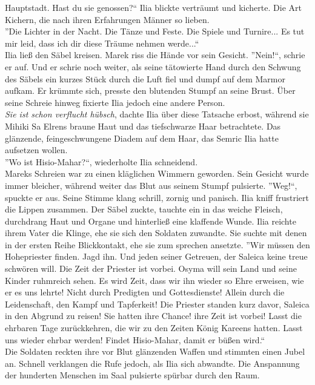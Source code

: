 Hauptstadt. Hast du sie genossen?`` Ilia blickte verträumt und kicherte. Die Art Kichern, die nach 
ihren Erfahrungen Männer so lieben.\\
''Die Lichter in der Nacht. Die Tänze und Feste. Die Spiele und Turnire... Es tut mir leid, dass 
ich dir diese Träume nehmen werde...``\\
Ilia ließ den Säbel kreisen. Marek riss die Hände vor sein Gesicht. ''Nein!``, schrie er auf. Und 
er schrie noch weiter, als seine tätowierte Hand durch den Schwung des Säbels ein kurzes Stück 
durch die Luft fiel und dumpf auf dem Marmor aufkam. Er krümmte sich, presste den blutenden Stumpf 
an seine Brust. Über seine Schreie hinweg fixierte Ilia jedoch eine andere Person.\\
\textit{Sie ist schon verflucht hübsch}, dachte Ilia über diese Tatsache erbost, während sie Mihiki 
Sa Elrens braune Haut und das tiefschwarze Haar betrachtete. Das glänzende, feingeschwungene Diadem 
auf dem Haar, das Semric Ilia hatte aufsetzen wollen.\\
''Wo ist Hisio-Mahar?``, wiederholte Ilia schneidend.\\
Mareks Schreien war zu einen kläglichen Wimmern geworden. Sein Gesicht wurde immer bleicher, 
während weiter das Blut aus seinem Stumpf pulsierte. ''Weg!``, spuckte er aus. Seine Stimme klang 
schrill, zornig und panisch. Ilia kniff frustriert die Lippen zusammen. Der Säbel zuckte, tauchte 
ein in das weiche Fleisch, durchdrang Haut und Organe und hinterließ eine klaffende Wunde. Ilia 
reichte ihrem Vater die Klinge, ehe sie sich den Soldaten zuwandte. Sie suchte mit denen in der 
ersten Reihe Blickkontakt, ehe sie zum sprechen ansetzte. ''Wir müssen den Hohepriester finden. 
Jagd ihn. Und jeden seiner Getreuen, der Saleica keine treue schwören will. Die Zeit der Priester 
ist vorbei. Osyma will sein Land und seine Kinder ruhmreich sehen. Es wird Zeit, dass wir ihn 
wieder so Ehre erweisen, wie er es uns lehrte! Nicht durch Predigten und Gottesdienste! Allein 
durch die Leidenschaft, den Kampf und Tapferkeit! Die Priester standen kurz davor, Saleica in den 
Abgrund zu reisen! Sie hatten ihre Chance! ihre Zeit ist vorbei! Lasst 
die ehrbaren Tage zurückkehren, die wir zu den Zeiten König Kareens hatten. Lasst uns wieder ehrbar 
werden! Findet Hisio-Mahar, damit er büßen wird.``\\
Die Soldaten reckten ihre vor Blut glänzenden Waffen und stimmten einen Jubel an. Schnell 
verklangen die Rufe jedoch, als Ilia sich abwandte. Die Anspannung der hunderten Menschen im Saal 
pulsierte spürbar durch den Raum.\\
